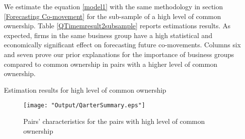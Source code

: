 			
			We estimate the equation \ref{model1} with the same methodology in section \ref{Forecasting Co-movement}  for the sub-sample of a high level of common ownership. Table \ref{QTimemresult2subsample} reports estimations results. As expected, firms in the same business group have a high statistical and economically significant effect on forecasting future co-movements. Columns six and seven prove our prior explanations for the importance of business groups compared to common ownership in pairs with a higher level of common ownership.
			
			{\begin{table}[htbp]
					\centering
					\caption{\scriptsize Estimation results for high level of common ownership}
					\label{QTimemresult2subsample}
					{
						
					}
			\end{table}}
			
			\begin{figure}[htbp]
				\centering  
				\texttt{[image: "Output/QarterSummary.eps"]}
				\caption{Pairs' characteristics for the pairs with high level of common ownership}
				\label{QarterSummary}
			\end{figure}
			
